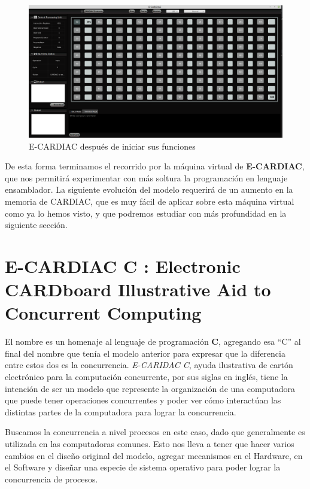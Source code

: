 \documentclass[letterpaper,12pt,oneside]{book}
\begin{document}
	\begin{figure}[H]
			\includegraphics[scale=0.28]{media/ECARDIAC/ECARDIAC_P2.png}
			\caption{E-CARDIAC después de iniciar sus funciones}
			\label{fig:enceCardiac}
			
	\end{figure}
	
	
	De esta forma terminamos el recorrido por la máquina virtual de \textbf{E-CARDIAC}, que nos permitirá experimentar con más soltura la programación en
	lenguaje ensamblador. La siguiente evolución del modelo requerirá de un aumento en la memoria de CARDIAC, que es muy fácil
	de aplicar sobre esta  máquina virtual como ya lo hemos visto, y que podremos estudiar con más profundidad en la siguiente
	sección.


	\clearpage	
		
	\section{E-CARDIAC C : Electronic CARDboard Illustrative Aid to Concurrent Computing}
		
	El nombre es un homenaje al lenguaje de programación \textbf{C}, agregando esa ``C'' al final del nombre que tenía el modelo anterior
	para expresar que la diferencia entre estos dos es la concurrencia. \textit{E-CARIDAC C}, ayuda ilustrativa de cartón electrónico para
	la computación concurrente, por sus siglas en inglés, tiene la intención de ser un modelo que represente la organización de una computadora que puede tener operaciones concurrentes
	y poder ver cómo interactúan las distintas partes de la computadora para lograr la concurrencia.
 
    Buscamos la concurrencia a nivel procesos
	en este caso, dado que generalmente es utilizada en las computadoras comunes. Esto nos lleva a tener que hacer varios cambios en el diseño original
	del modelo, agregar mecanismos en el Hardware, en el Software y diseñar una especie de sistema operativo para poder lograr la concurrencia de 
	procesos.
	
\end{document}
